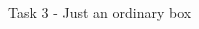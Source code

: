 \begin{frame}{Task 3 - Just an ordinary box}
    \begin{columns}
        \begin{column}{0.5\textwidth}
            \begin{figure}[h]
                {
                    \setlength{\fboxsep}{0pt}%
                    \setlength{\fboxrule}{0.5pt}%
                }
            \end{figure}
        \end{column}
        \begin{column}{0.5\textwidth}
            \begin{figure}[h]
                {
                    \setlength{\fboxsep}{0pt}%
                    \setlength{\fboxrule}{0.5pt}%
}
\end{figure}
\end{column}
\end{columns}
\end{frame}
